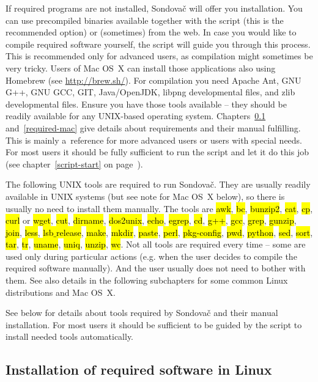 \documentclass[a4paper, 11pt, twoside]{article}
\renewcommand{\texttt}[1]{\hl{\ttfamily #1}}
\begin{document}
If required programs are not installed, Sondovač will offer you installation. You can use precompiled binaries available together with the script (this is the recommended option) or (sometimes) from the web. In case you would like to compile required software yourself, the script will guide you through this process. This is recommended only for advanced users, as compilation might sometimes be very tricky. Users of Mac OS~X can install those applications also using Homebrew (see \url{http://brew.sh/}). For compilation you need Apache Ant, GNU G++, GNU GCC, GIT, Java/OpenJDK, libpng developmental files, and zlib developmental files. Ensure you have those tools available -- they should be readily available for any UNIX-based operating system. Chapters~\ref{required-linux} and~\ref{required-mac} give details about requirements and their manual fulfilling. This is mainly a~reference for more advanced users or users with special needs. For most users it should be fully sufficient to run the script and let it do this job (see chapter~\ref{script-start} on page~\pageref{script-usage}).

The following UNIX tools are required to run Sondovač. They are usually readily available in UNIX systems (but see note for Mac OS~X below), so there is usually no need to install them manually. The tools are \texttt{awk}, \texttt{bc}, \texttt{bunzip2}, \texttt{cat}, \texttt{cp}, \texttt{curl} or \texttt{wget}, \texttt{cut}, \texttt{dirname}, \texttt{dos2unix}, \texttt{echo}, \texttt{egrep}, \texttt{cd}, \texttt{g++}, \texttt{gcc}, \texttt{grep}, \texttt{gunzip}, \texttt{join}, \texttt{less}, \texttt{lsb$\_$release}, \texttt{make}, \texttt{mkdir}, \texttt{paste}, \texttt{perl}, \texttt{pkg-config}, \texttt{pwd}, \texttt{python}, \texttt{sed}, \texttt{sort}, \texttt{tar}, \texttt{tr}, \texttt{uname}, \texttt{uniq}, \texttt{unzip}, \texttt{wc}. Not all tools are required every time -- some are used only during particular actions (e.g. when the user decides to compile the required software manually). And the user usually does not need to bother with them. See also details in the following subchapters for some common Linux distributions and Mac OS~X.

See below for details about tools required by Sondovač and their manual installation. For most users it should be sufficient to be guided by the script to install needed tools automatically.

\subsection{Installation of required software in Linux}
\label{required-linux}
\end{document}
